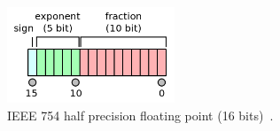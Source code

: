 \documentclass[logo,bsc,singlespacing,parskip]{infthesis}
\newcommand{\dtfloat}{\texttt{float}}
\newcommand{\pivot}{\texttt{pivot}}
\begin{document}

\begin{figure}[H]
    \begin{center}
    \includegraphics[width=50mm,scale=0.1]{image/ieee-f16.png}
    \end{center}
    \caption{IEEE 754 half precision floating point (16 bits)~\cite{fp16-diagram}.}
    \label{fig:ieee-f16}
\end{figure}











\end{document}
